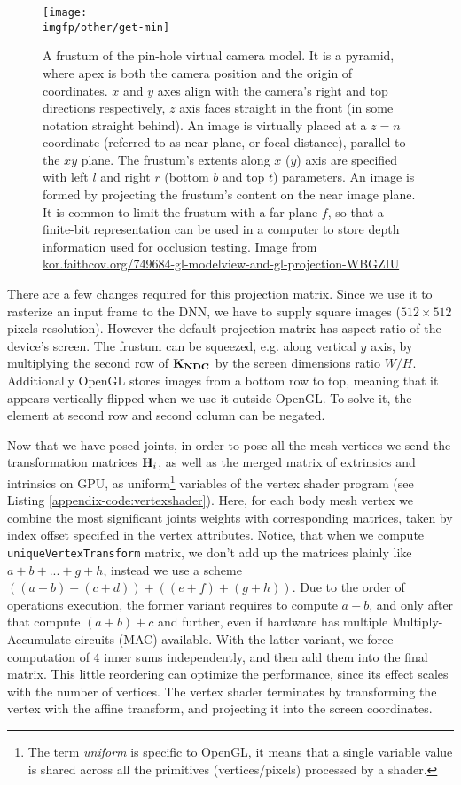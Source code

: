 \begin{figure}
	\centering
	\texttt{[image: \\imgfp/other/get-min]}
	\caption{A frustum of the pin-hole virtual camera model. It is a pyramid, where apex is both the camera position and the origin of coordinates. $x$ and $y$ axes align with the camera's right and top directions respectively, $z$ axis faces straight in the front (in some notation straight behind). An image is virtually placed at a $z = n$ coordinate (referred to as near plane, or focal distance), parallel to the $xy$ plane. The frustum's extents along $x$ ($y$) axis are specified with left $l$ and right $r$ (bottom $b$ and top $t$) parameters. An image is formed by projecting the frustum's content on the near image plane. It is common to limit the frustum with a far plane $f$, so that a finite-bit representation can be used in a computer to store depth information used for occlusion testing. Image from \href{https://kor.faithcov.org/749684-gl-modelview-and-gl-projection-WBGZIU}{kor.faithcov.org/749684-gl-modelview-and-gl-projection-WBGZIU}}
	\label{fig:frustum}
\end{figure}


There are a few changes required for this projection matrix. Since we use it to rasterize an input frame to the DNN, we have to supply square images ($512 \times 512$ pixels resolution). However the default projection matrix has aspect ratio of the device's screen. The frustum can be squeezed, e.g. along vertical $y$ axis, by multiplying the second row of $\bm{\mathrm{K_{NDC}}}$ by the screen dimensions ratio $W / H$. Additionally OpenGL stores images from a bottom row to top, meaning that it appears vertically flipped when we use it outside OpenGL. To solve it, the element at second row and second column can be negated.

Now that we have posed joints, in order to pose all the mesh vertices we send the transformation matrices $\bm{\mathrm{H}}_i$, as well as the merged matrix of extrinsics and intrinsics on GPU, as uniform\footnote{The term \textit{uniform} is specific to OpenGL, it means that a single variable value is shared across all the primitives (vertices/pixels) processed by a shader.} variables of the vertex shader program (see Listing \ref{appendix-code:vertexshader}). Here, for each body mesh vertex we combine the most significant joints weights with corresponding matrices, taken by index offset specified in the vertex attributes. Notice, that when we compute \verb|uniqueVertexTransform| matrix, we don't add up the matrices plainly like $a + b + ... + g + h$, instead we use a scheme $((a + b) + (c + d)) + ((e + f) + (g + h))$. Due to the order of operations execution, the former variant requires to compute $a + b$, and only after that compute $(a+b) + c$ and further, even if hardware has multiple Multiply-Accumulate circuits (MAC) available. With the latter variant, we force computation of 4 inner sums independently, and then add them into the final matrix. This little reordering can optimize the performance, since its effect scales with the number of vertices. The vertex shader terminates by transforming the vertex with the affine transform, and projecting it into the screen coordinates. 

